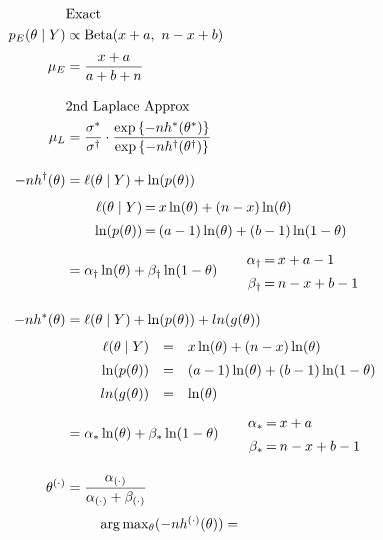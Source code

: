 \documentclass[12pt, letterpaper]{article}
\begin{document}
\begin{align*}
	&\text{Exact} \\
	p_E(\theta \mid Y) & \propto \text{Beta}(x + a, \ n - x + b)  
	\\[0.5ex]
	\mu_{E} & = \frac{ x + a}{ a + b + n} 
	\\[2ex]
	&\text{2nd Laplace Approx} 
	\\
	\mu_{L} & = \frac{ \sigma^*}{\sigma^\dagger} \cdot \frac{ \exp \left\{ - nh^*(\theta^*) \right\} }
	{ \exp \left\{ - nh^\dagger(\theta^\dagger) \right\} }
	\\[2ex]
	-nh^\dagger(\theta) & = \ell(\theta \mid Y) + \ln(p(\theta) )
	\\
	& \quad  \quad \arraycolsep=1pt \def\arraystretch{1.4}   \begin{array}{r c l}
		\ell(\theta \mid Y) & =& x \ln(\theta) + (n - x) \ln(\theta) \\
		\ln(p(\theta)) & =& (a - 1) \ln(\theta) + (b-1)\ln(1 - \theta) 
	\end{array} 
	\\
	&= \alpha_\dagger  \ln(\theta) + \beta_\dagger  \ln(1 - \theta) 
	\quad \quad \arraycolsep=1pt \def\arraystretch{1.4}  \begin{array}{r c l}
	\alpha_\dagger &=& x + a -1 \\
	\beta_\dagger &=& n - x + b - 1 
	\end{array} 
	\\[2ex]
		-nh^*(\theta) & = \ell(\theta \mid Y) + \ln(p(\theta) ) + ln(g(\theta))
	\\
	& \quad  \quad \begin{array}{r c l}
	\ell(\theta \mid Y) & =& x \ln(\theta) + (n - x) \ln(\theta) \\
	\ln(p(\theta)) & =& (a - 1) \ln(\theta) + (b-1)\ln(1 - \theta) \\
	ln(g(\theta)) &=& \ln(\theta) 
	\end{array} 
	\\
	&= \alpha_* \ln(\theta) + \beta_* \ln(1 - \theta) 
	\quad \quad \arraycolsep=1pt \def\arraystretch{1.4}  \begin{array}{r c l}
	\alpha_* &=& x + a  \\
	\beta_* &=& n - x + b - 1 
	\end{array} 
	\\[2ex]
	\theta^{(\cdot)} &  = 
	 \frac{ \alpha_{(\cdot)} }{ \alpha_{(\cdot)} + \beta_{(\cdot)} } \\
		& \quad \quad \begin{array}{l} 
		\arg\max_\theta (- nh^{(\cdot)}(\theta)) = 

\end{array}
\end{align*}
\end{document}
